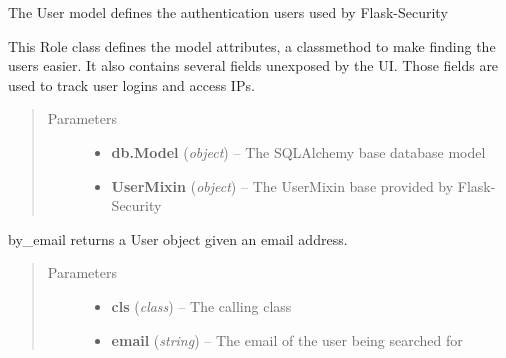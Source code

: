 \documentclass[letterpaper,10pt,english]{sphinxmanual}
\begin{document}
\begin{fulllineitems}
\label{dev-users:cagenix.users.models.User}
The User model defines the authentication users used by Flask-Security

This Role class defines the model attributes, a classmethod to make finding
the users easier. It also contains several fields unexposed by the UI. Those
fields are used to track user logins and access IPs.
\begin{quote}\begin{description}
\item[{Parameters}] \leavevmode\begin{itemize}
\item {} 
\textbf{db.Model} (\emph{object}) -- The SQLAlchemy base database model

\item {} 
\textbf{UserMixin} (\emph{object}) -- The UserMixin base provided by Flask-Security

\end{itemize}

\end{description}\end{quote}

\begin{fulllineitems}
\label{dev-users:cagenix.users.models.User.by_email}
by\_email returns a User object given an email address.
\begin{quote}\begin{description}
\item[{Parameters}] \leavevmode\begin{itemize}
\item {} 
\textbf{cls} (\emph{class}) -- The calling class

\item {} 
\textbf{email} (\emph{string}) -- The email of the user being searched for

\end{itemize}

\end{description}\end{quote}

\end{fulllineitems}



\end{fulllineitems}
\end{document}
